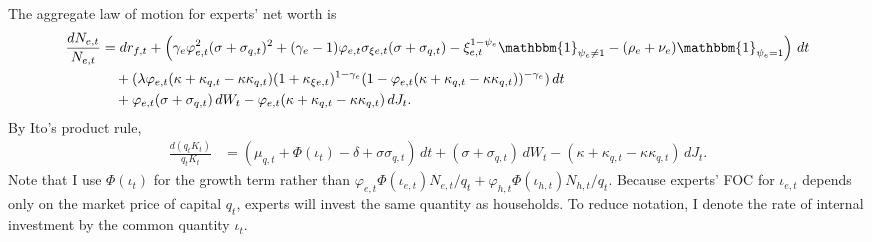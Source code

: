 \documentclass[12 pt, oneside]{article}
\theoremstyle{definition}
\theoremstyle{definition}
\theoremstyle{definition}
\begin{document}
The aggregate law of motion for experts' net worth is
\begin{align*}
  \frac{dN_{e, t}}{N_{e, t}} & = dr_{f, t} + \left(\gamma_e \varphi_{e, t}^2( \sigma + \sigma_{q, t})^2 + (\gamma_e - 1)\varphi_{e, t}\sigma_{\xi e, t} ( \sigma + \sigma_{q, t}) - \xi_{e, t}^{1 - \psi_e}\mathbbm{1}_{\psi_e\neq 1} - (\rho_e + \nu_e)\mathbbm{1}_{\psi_e = 1}  \right)\, dt\\
                             &\quad + (\lambda\varphi_{e, t}(\kappa + \kappa_{q, t} - \kappa\kappa_{q, t})(1 + \kappa_{\xi e, t})^{ 1 - \gamma_e}(1 - \varphi_{e, t}(\kappa + \kappa_{q, t} - \kappa\kappa_{q, t}))^{ - \gamma_e})\, dt\\
                             &\quad + \varphi_{e, t}(\sigma + \sigma_{q, t})\, dW_t - \varphi_{e, t}(\kappa + \kappa_{q, t} - \kappa \kappa_{q, t})\, dJ_t.
\end{align*}
By Ito's product rule,
\begin{align*}
  \frac{d(q_tK_t)}{q_tK_t} & = (\mu_{q, t} + \Phi(\iota_t) - \delta + \sigma\sigma_{q, t})\, dt + (\sigma + \sigma_{q, t})\, dW_t - (\kappa + \kappa_{q, t} - \kappa\kappa_{q, t})\, dJ_t.
\end{align*}
Note that I use $\Phi(\iota_t)$ for the growth term rather than $\varphi_{e, t}\Phi(\iota_{e, t}) N_{e, t}/ q_t + \varphi_{h, t}\Phi(\iota_{h, t}) N_{h, t} / q_t$. Because experts' FOC for $\iota_{e, t}$ depends only on the market price of capital $q_t$, experts will invest the same quantity as households. To reduce notation, I denote the rate of internal investment by the common quantity $\iota_t$.
\end{document}
